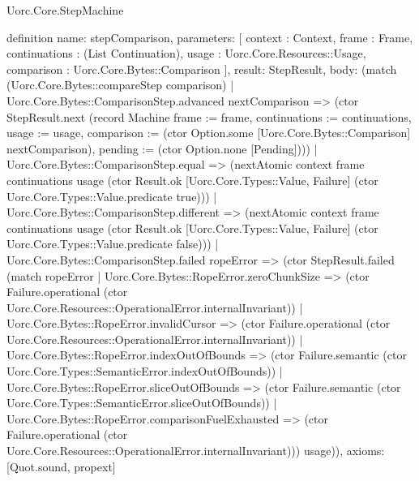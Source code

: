 \begin{lexlean}{Uorc.Core.StepMachine}
\begin{semanticmodule}
definition{
  name: stepComparison,
  parameters: [
    context : Context,
    frame : Frame,
    continuations : (List Continuation),
    usage : Uorc.Core.Resources::Usage,
    comparison : Uorc.Core.Bytes::Comparison
  ],
  result: StepResult,
  body: (match (Uorc.Core.Bytes::compareStep comparison)
    | Uorc.Core.Bytes::ComparisonStep.advanced nextComparison => (ctor StepResult.next (record Machine {frame := frame, continuations := continuations, usage := usage, comparison := (ctor Option.some [Uorc.Core.Bytes::Comparison] nextComparison), pending := (ctor Option.none [Pending])}))
    | Uorc.Core.Bytes::ComparisonStep.equal => (nextAtomic context frame continuations usage (ctor Result.ok [Uorc.Core.Types::Value, Failure] (ctor Uorc.Core.Types::Value.predicate true)))
    | Uorc.Core.Bytes::ComparisonStep.different => (nextAtomic context frame continuations usage (ctor Result.ok [Uorc.Core.Types::Value, Failure] (ctor Uorc.Core.Types::Value.predicate false)))
    | Uorc.Core.Bytes::ComparisonStep.failed ropeError => (ctor StepResult.failed (match ropeError
      | Uorc.Core.Bytes::RopeError.zeroChunkSize => (ctor Failure.operational (ctor Uorc.Core.Resources::OperationalError.internalInvariant))
      | Uorc.Core.Bytes::RopeError.invalidCursor => (ctor Failure.operational (ctor Uorc.Core.Resources::OperationalError.internalInvariant))
      | Uorc.Core.Bytes::RopeError.indexOutOfBounds => (ctor Failure.semantic (ctor Uorc.Core.Types::SemanticError.indexOutOfBounds))
      | Uorc.Core.Bytes::RopeError.sliceOutOfBounds => (ctor Failure.semantic (ctor Uorc.Core.Types::SemanticError.sliceOutOfBounds))
      | Uorc.Core.Bytes::RopeError.comparisonFuelExhausted => (ctor Failure.operational (ctor Uorc.Core.Resources::OperationalError.internalInvariant))) usage)),
  axioms: [Quot.sound, propext]
}


\end{semanticmodule}
\end{lexlean}
